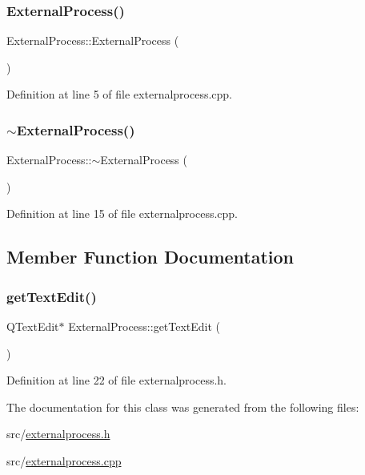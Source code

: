 \subsubsection{\texorpdfstring{ExternalProcess()}{ExternalProcess()}}
{\footnotesize\ttfamily External\+Process\+::\+External\+Process (\begin{DoxyParamCaption}{ }\end{DoxyParamCaption})}



Definition at line 5 of file externalprocess.\+cpp.

\mbox{\label{class_external_process_aa80ad7b73431a46448382049e8fd39db}} 
\subsubsection{\texorpdfstring{$\sim$ExternalProcess()}{~ExternalProcess()}}
{\footnotesize\ttfamily External\+Process\+::$\sim$\+External\+Process (\begin{DoxyParamCaption}{ }\end{DoxyParamCaption})}



Definition at line 15 of file externalprocess.\+cpp.



\subsection{Member Function Documentation}
\mbox{\label{class_external_process_a7f5259ee1ed3094cff299dae5fd8d557}} 
\subsubsection{\texorpdfstring{getTextEdit()}{getTextEdit()}}
{\footnotesize\ttfamily Q\+Text\+Edit$\ast$ External\+Process\+::get\+Text\+Edit (\begin{DoxyParamCaption}{ }\end{DoxyParamCaption})\hspace{0.3cm}{\ttfamily [inline]}}



Definition at line 22 of file externalprocess.\+h.



The documentation for this class was generated from the following files\+:\begin{DoxyCompactItemize}
\item 
src/\mbox{\hyperlink{externalprocess_8h}{externalprocess.\+h}}\item 
src/\mbox{\hyperlink{externalprocess_8cpp}{externalprocess.\+cpp}}\end{DoxyCompactItemize}
